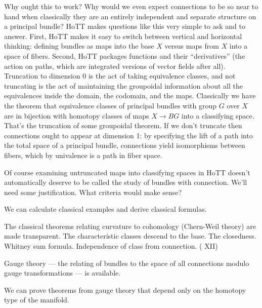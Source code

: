 \documentclass[12pt]{article}
\begin{document}
Why ought this to work? Why would we even expect connections to be so near to hand when classically they are an entirely independent and separate structure on a principal bundle? HoTT makes questions like this very simple to ask and to answer. First, HoTT makes it easy to switch between vertical and horizontal thinking: defining bundles as maps into the base \( X \) versus maps from \( X \) into a space of fibers. Second, HoTT packages functions and their ``derivatives'' (the action on paths, which are integrated versions of vector fields after all). Truncation to dimension 0 is the act of taking equivalence classes, and not truncating is the act of maintaining the groupoidal information about all the equivalences inside the domain, the codomain, and the maps. Classically we have the theorem that equivalence classes of principal bundles with group \( G \) over \( X \) are in bijection with homotopy classes of maps \( X\to BG \) into a classifying space. That's the truncation of some groupoidal theorem. If we don't truncate then connections ought to appear at dimension 1: by specifying the lift of a path into the total space of a principal bundle, connections yield isomorphisms between fibers, which by univalence is a path in fiber space.

Of course examining untruncated maps into classifying spaces in HoTT doesn't automatically deserve to be called the study of bundles with connection. We'll need some justification. What criteria would make sense?

\begin{myclaim}
We can calculate classical examples and derive classical formulas.
\end{myclaim}

\begin{myclaim}
The classical theorems relating curvature to cohomology (Chern-Weil theory) are made transparent. The characteristic classes descend to the base. The closedness. Whitney sum formula. Independence of class from connection. (\cite{kobayashinomizu} XII)
\end{myclaim}

\begin{myclaim}
Gauge theory --- the relating of bundles to the space of all connections modulo gauge transformations --- is available.
\end{myclaim}

\begin{myclaim}
We can prove theorems from gauge theory that depend only on the homotopy type of the manifold.
\end{myclaim}
\end{document}
